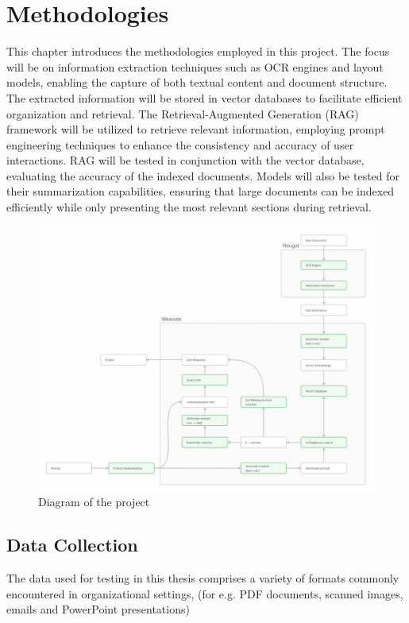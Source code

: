 \chapter{Methodologies}
\label{chapter:Methodologies}
This chapter introduces the methodologies employed in this project. The focus will be on information extraction techniques such as OCR engines and layout models, enabling the capture of both textual content and document structure. The extracted information will be stored in vector databases to facilitate efficient organization and retrieval. The Retrieval-Augmented Generation (RAG) framework will be utilized to retrieve relevant information, employing prompt engineering techniques to enhance the consistency and accuracy of user interactions. RAG will be tested in conjunction with the vector database, evaluating the accuracy of the indexed documents. Models will also be tested for their summarization capabilities, ensuring that large documents can be indexed efficiently while only presenting the most relevant sections during retrieval.
\begin{figure}[H]
    \centering
    \includegraphics[width=1\linewidth]{Figures/graph_methods.png}
    \caption{Diagram of the project}
    \label{fig:methodology}
\end{figure}

\section{Data Collection}
The data used for testing in this thesis comprises a variety of formats commonly encountered in organizational settings, (for e.g. PDF documents, scanned images, emails and PowerPoint presentations)

